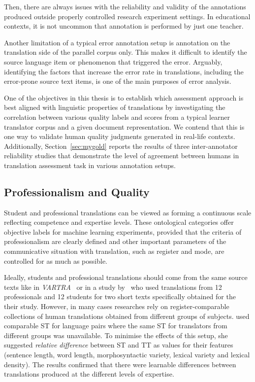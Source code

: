 Then, there are always issues with the reliability and validity of the annotations produced outside properly controlled research experiment settings. In educational contexts, it is not uncommon that annotation is performed by just one teacher. 

Another limitation of a typical error annotation setup is annotation on the translation side of the parallel corpus only. This makes it difficult to identify the source language item or phenomenon that triggered the error. Arguably, identifying the factors that increase the error rate in translations, including the error-prone source text items, is one of the main purposes of error analysis.

One of the objectives in this thesis is to establish which assessment approach is best aligned with linguistic properties of translations by investigating the correlation between various quality labels and scores from a typical learner translator corpus and a given document representation. We contend that this is one way to validate human quality judgments generated in real-life contexts.
Additionally, Section~\ref{sec:mygold} reports the results of three inter-annotator reliability studies that demonstrate the level of agreement between humans in translation assessment task in various annotation setups. %

\subsection{\label{ssec:pro}Professionalism and Quality}
Student and professional translations can be viewed as forming a continuous scale reflecting competence and expertise levels. These ontological categories offer objective labels for machine learning experiments, provided that the criteria of professionalism are clearly defined and other important parameters of the communicative situation with translation, such as register and mode, are controlled for as much as possible. 

Ideally, students and professional translations should come from the same source texts like in \textit{VARTRA}~\cite{Lapshinova2013} or in a study by~\citet{Carl2010} who used translations from 12 professionals and 12 students for two short texts specifically obtained for the their study. However, in many cases researches rely on register-comparable collections of human translations obtained from different groups of subjects. \citet{Popovic2020} used comparable ST for language pairs where the same ST for translators from different groups was unavailable. To minimise the effects of this setup, she suggested \textit{relative difference} between ST and TT as values for their features (sentence length, word length, morphosyntactic variety, lexical variety and lexical density). The results confirmed that there were learnable differences between translations produced at the different levels of expertise.


